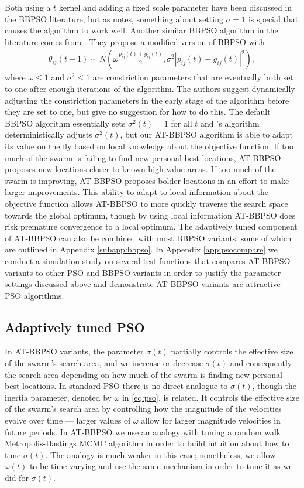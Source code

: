 \documentclass[12pt]{article}
\begin{document}
Both using a $t$ kernel and adding a fixed scale parameter have been discussed in the BBPSO literature, but as \citet{kennedy2003bare} notes, something about setting $\sigma=1$ is special that causes the algorithm to work well. Another similar BBPSO algorithm in the literature comes from \citet{hsieh2010modified}. They propose a modified version of BBPSO with 
\begin{align*}
\theta_{ij}(t+1) \sim N\left(\omega\frac{p_{ij}(t) + g_{ij}(t)}{2}, \sigma^2|p_{ij}(t) - g_{ij}(t)|^2\right),
\end{align*}
where $\omega\leq 1$ and $\sigma^2\leq 1$ are constriction parameters that are eventually both set to one after enough iterations of the algorithm. The authors suggest dynamically adjusting the constriction parameters in the early stage of the algorithm before they are set to one, but give no suggestion for how to do this. The default BBPSO algorithm essentially sets $\sigma^2(t)=1$ for all $t$ and \citet{hsieh2010modified}'s algorithm deterministically adjusts $\sigma^2(t)$, but our AT-BBPSO algorithm is able to adapt its value on the fly based on local knowledge about the objective function. If too much of the swarm is failing to find new personal best locations, AT-BBPSO proposes new locations closer to known high value areas. If too much of the swarm is improving, AT-BBPSO proposes bolder locations in an effort to make larger improvements. This ability to adapt to local information about the objective function allows AT-BBPSO to more quickly traverse the search space towards the global optimum, though by using local information AT-BBPSO does risk premature convergence to a local optimum. The adaptively tuned component of AT-BBPSO can also be combined with most BBPSO variants, some of which are outlined in Appendix \ref{subapp:bbpso}. In Appendix \ref{app:psocompare} we conduct a simulation study on several test functions that compares AT-BBPSO variants to other PSO and BBPSO variants in order to justify the parameter settings discussed above and demonstrate AT-BBPSO variants are attractive PSO algorithms.

\subsection{Adaptively tuned PSO}\label{sec:AT-PSO}
In AT-BBPSO variants, the parameter $\sigma(t)$ partially controls the effective size of the swarm's search area, and we increase or decrease $\sigma(t)$ and consequently the search area depending on how much of the swarm is finding new personal best locations. In standard PSO there is no direct analogue to $\sigma(t)$, though the inertia parameter, denoted by $\omega$ in \eqref{eq:pso}, is related. It controls the effective size of the swarm's search area by controlling how the magnitude of the velocities evolve over time --- larger values of $\omega$ allow for larger magnitude velocities in future periods. In AT-BBPSO we use an analogy with tuning a random walk Metropolis-Hastings MCMC algorithm in order to build intuition about how to tune $\sigma(t)$. The analogy is much weaker in this case; nonetheless, we allow $\omega(t)$ to be time-varying and use the same mechanism in order to tune it as we did for $\sigma(t)$.
\end{document}

